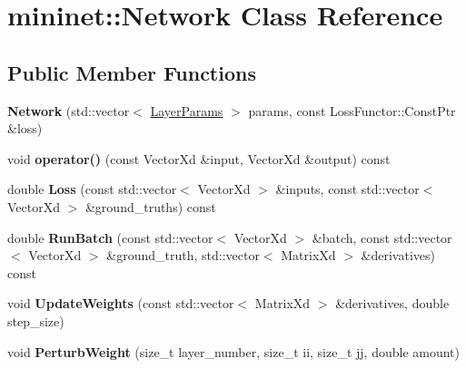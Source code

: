 \hypertarget{classmininet_1_1_network}{}\section{mininet\+:\+:Network Class Reference}
\label{classmininet_1_1_network}
\subsection*{Public Member Functions}
\begin{DoxyCompactItemize}
\item 
\hypertarget{classmininet_1_1_network_acf2c102c6f79c152380124af7b327b89}{}\label{classmininet_1_1_network_acf2c102c6f79c152380124af7b327b89} 
{\bfseries Network} (std\+::vector$<$ \hyperlink{structmininet_1_1_layer_params}{Layer\+Params} $>$ params, const Loss\+Functor\+::\+Const\+Ptr \&loss)
\item 
\hypertarget{classmininet_1_1_network_a56fe1d7f1daf3433c9f0d5df408b4800}{}\label{classmininet_1_1_network_a56fe1d7f1daf3433c9f0d5df408b4800} 
void {\bfseries operator()} (const Vector\+Xd \&input, Vector\+Xd \&output) const
\item 
\hypertarget{classmininet_1_1_network_ae76628cf7258aa0b8d0ee147e580623e}{}\label{classmininet_1_1_network_ae76628cf7258aa0b8d0ee147e580623e} 
double {\bfseries Loss} (const std\+::vector$<$ Vector\+Xd $>$ \&inputs, const std\+::vector$<$ Vector\+Xd $>$ \&ground\+\_\+truths) const
\item 
\hypertarget{classmininet_1_1_network_a52d7bf3f7a6ff4ca2d2fe93758b48cc0}{}\label{classmininet_1_1_network_a52d7bf3f7a6ff4ca2d2fe93758b48cc0} 
double {\bfseries Run\+Batch} (const std\+::vector$<$ Vector\+Xd $>$ \&batch, const std\+::vector$<$ Vector\+Xd $>$ \&ground\+\_\+truth, std\+::vector$<$ Matrix\+Xd $>$ \&derivatives) const
\item 
\hypertarget{classmininet_1_1_network_a09c5c7f9617732fa35308e0218e06ec8}{}\label{classmininet_1_1_network_a09c5c7f9617732fa35308e0218e06ec8} 
void {\bfseries Update\+Weights} (const std\+::vector$<$ Matrix\+Xd $>$ \&derivatives, double step\+\_\+size)
\item 
\hypertarget{classmininet_1_1_network_a3b1a8593348f1e0aa1a4a1457d3d6ab2}{}\label{classmininet_1_1_network_a3b1a8593348f1e0aa1a4a1457d3d6ab2} 
void {\bfseries Perturb\+Weight} (size\+\_\+t layer\+\_\+number, size\+\_\+t ii, size\+\_\+t jj, double amount)
\end{DoxyCompactItemize}


